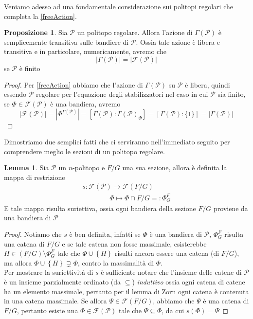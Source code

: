 \documentclass[a4paper,12pt]{report}
\newcommand{\p}{\mathcal{P}}
\theoremstyle{plain}
\theoremstyle{definition}
\newtheorem{lem}[teo]{Lemma}
\newtheorem{prop}[teo]{Proposizione}
\begin{document}
Veniamo adesso ad una fondamentale considerazione sui politopi regolari che completa la \ref{freeAction}.
\begin{prop}
Sia $\p$ un politopo regolare. Allora l'azione di $\Gamma(\p)$ \`e semplicemente transitiva sulle bandiere di $\p$. Ossia tale azione \`e 
libera e transitiva e in particolare, numericamente, avremo che
\begin{equation*}
\left|\Gamma(\p)\right|=\left|\mathcal{F}(\p)\right|
\end{equation*}
se $\p$ \`e finito
\end{prop}
\begin{proof}
Per \ref{freeAction} abbiamo che l'azione di $\Gamma(\p)$ su $\p$ \`e libera, quindi essendo $\p$ regolare per l'equazione degli stabilizzatori
nel caso in cui $\p$ sia finito, se $\Phi\in\mathcal{F}(\p)$ \`e una bandiera, avremo
\begin{equation*}
\left|\mathcal{F}(\p)\right|=\left|\Phi^{\Gamma(\p)}\right|=\left[\Gamma(\p):\Gamma(\p)_\Phi\right]=\left[\Gamma(\p):\{1\}\right]
=\left|\Gamma(\p)\right|
\end{equation*}
\end{proof}

Dimostriamo due semplici fatti che ci serviranno nell'immediato seguito per comprendere meglio le sezioni di un politopo regolare.

\begin{lem}
\label{lem:SectionFlags}
Sia $\p$ un $n$-politopo e $F/G$ una sua sezione, allora \`e definita la mappa di restrizione
\begin{gather*}
s:\mathcal{F}(\p)\longrightarrow\mathcal{F}(F/G)\\
\qquad\qquad \Phi\longmapsto\Phi\cap F/G=:\Phi_G^F
\end{gather*}
E tale mappa risulta suriettiva, ossia ogni bandiera della sezione $F/G$ proviene da una bandiera di $\p$
\end{lem}
\begin{proof}
Notiamo che $s$ \`e ben definita, infatti se $\Phi$ \`e una bandiera di $\p$, $\Phi_G^F$ risulta una catena di $F/G$
e se tale catena non fosse massimale, esisterebbe $H\in (F/G)\setminus\Phi_G^F$ tale che $\Phi\cup\left\{H\right\}$ risulti ancora essere
una catena (di $F/G$), ma allora $\Phi\cup\left\{H\right\}\supsetneq\Phi$, contro la massimalit\`a di $\Phi$.\\
Per mostrare la suriettivit\`a di $s$ \`e sufficiente notare che l'insieme delle catene di $\p$ \`e un insieme 
parzialmente ordinato (da $\subseteq$) \emph{induttivo} ossia
ogni catena di catene ha un elemento massimale, pertanto per il lemma di Zorn ogni catena \`e contenuta in una catena massimale.
Se allora $\Psi\in\mathcal{F}(F/G)$, abbiamo che $\Psi$ \`e una catena di $F/G$, pertanto esiste una $\Phi\in\mathcal{F}(\p)$
tale che $\Psi\subseteq\Phi$, da cui $s(\Phi)=\Psi$
\end{proof}
\end{document}

